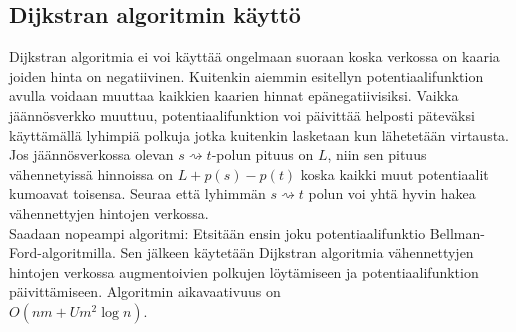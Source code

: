 \documentclass[a4paper, 11pt]{article}
\begin{document}
\subsection*{Dijkstran algoritmin käyttö}
Dijkstran algoritmia ei voi käyttää ongelmaan suoraan koska verkossa on kaaria joiden hinta on
negatiivinen. Kuitenkin aiemmin esitellyn potentiaalifunktion
avulla voidaan muuttaa kaikkien kaarien hinnat epänegatiivisiksi. 
Vaikka jäännösverkko muuttuu, potentiaalifunktion voi päivittää helposti päteväksi
käyttämällä lyhimpiä polkuja jotka kuitenkin lasketaan kun lähetetään virtausta.
Jos jäännösverkossa olevan $s \rightsquigarrow t$-polun pituus on $L$, niin
sen pituus vähennetyissä hinnoissa on $L + p(s) - p(t)$ koska kaikki muut potentiaalit
kumoavat toisensa. Seuraa että lyhimmän 
$s \rightsquigarrow t$ polun voi yhtä hyvin hakea vähennettyjen hintojen verkossa.\\
Saadaan nopeampi algoritmi: Etsitään ensin joku potentiaalifunktio Bellman-Ford-algoritmilla.
Sen jälkeen käytetään Dijkstran algoritmia vähennettyjen hintojen verkossa augmentoivien polkujen
löytämiseen ja potentiaalifunktion päivittämiseen. Algoritmin aikavaativuus on \\$O(nm + Um^2 \log n)$.
\end{document}
